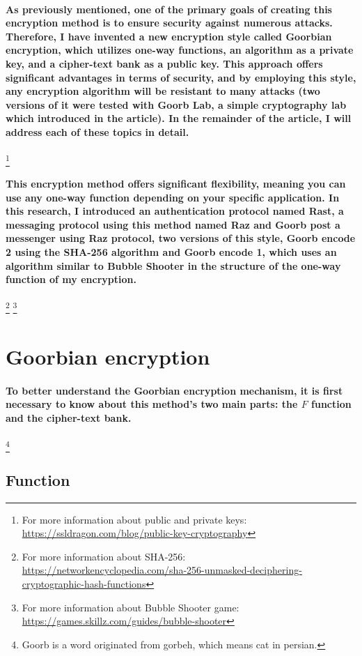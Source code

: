 \documentclass[oneside]{book}
\newcommand{\myparagraph}[1]{\paragraph{\textnormal{#1}}}
\begin{document}
\myparagraph{
As previously mentioned, one of the primary goals of creating this encryption method is to ensure security against numerous attacks. Therefore, I have invented a new encryption style called \textbf{Goorbian encryption}, which utilizes one-way functions, an algorithm as a private key, and a cipher-text bank as a public key. This approach offers significant advantages in terms of security, and by employing this style, any encryption algorithm will be resistant to many attacks (two versions of it were tested with \textbf{Goorb Lab}, a simple cryptography lab which introduced in the article). In the remainder of the article, I will address each of these topics in detail.
}
\footnote{For more information about public and private keys:\\ \href{https://ssldragon.com/blog/public-key-cryptography}{https://ssldragon.com/blog/public-key-cryptography}}

\myparagraph{
This encryption method offers significant flexibility, meaning you can use any one-way function depending on your specific application. In this research, I introduced an authentication protocol named \textbf{Rast}, a messaging protocol using this method named \textbf{Raz} and \textbf{Goorb post} a messenger using Raz protocol, two versions of this style, \textbf{Goorb encode 2} using the SHA-256 algorithm and \textbf{Goorb encode 1}, which uses an algorithm similar to Bubble Shooter in the structure of the one-way function of my encryption.
}
\footnote{For more information about SHA-256:\\ \href{https://networkencyclopedia.com/sha-256-unmasked-deciphering-cryptographic-hash-functions}{https://networkencyclopedia.com/sha-256-unmasked-deciphering-cryptographic-hash-functions}}
\footnote{For more information about Bubble Shooter game:\\ \href{https://games.skillz.com/guides/bubble-shooter}{https://games.skillz.com/guides/bubble-shooter}}

\section{Goorbian encryption}

\myparagraph{
To better understand the \textbf{Goorbian encryption} mechanism, it is first necessary to know about this method's two main parts: the $F$ function and the cipher-text bank.
}
\footnote{Goorb is a word originated from gorbeh, which means cat in persian.}

\subsection{Function}
\end{document}
